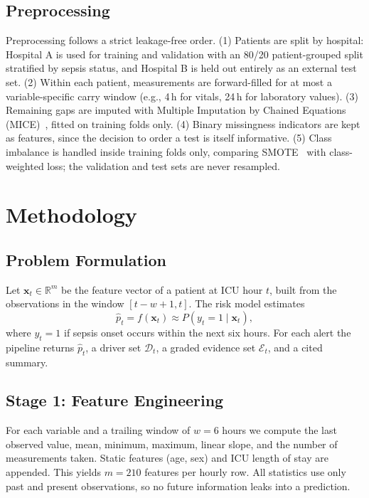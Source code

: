 \documentclass[conference]{IEEEtran}
\begin{document}
\subsection{Preprocessing}
Preprocessing follows a strict leakage-free order. (1) Patients are split
by hospital: Hospital A is used for training and validation with an 80/20
patient-grouped split stratified by sepsis status, and Hospital B is held out entirely as an
external test set. (2) Within each patient, measurements are
forward-filled for at most a variable-specific carry window (e.g., 4\,h for
vitals, 24\,h for laboratory values). (3) Remaining gaps are imputed with
Multiple Imputation by Chained Equations (MICE)~\cite{vanbuuren2011mice},
fitted on training folds only. (4) Binary missingness indicators are kept
as features, since the decision to order a test is itself
informative. (5) Class imbalance is handled inside training folds only,
comparing SMOTE~\cite{chawla2002smote} with class-weighted loss; the
validation and test sets are never resampled.

\section{Methodology}

\subsection{Problem Formulation}
Let $\mathbf{x}_{t} \in \mathbb{R}^{m}$ be the feature vector of a patient
at ICU hour $t$, built from the observations in the window $[t-w+1, t]$.
The risk model estimates
\begin{equation}
\hat{p}_t = f(\mathbf{x}_t) \approx P\left(y_t = 1 \mid \mathbf{x}_t\right),
\end{equation}
where $y_t=1$ if sepsis onset occurs within the next six hours. For each
alert the pipeline returns $\hat{p}_t$, a driver set $\mathcal{D}_t$, a
graded evidence set $\mathcal{E}_t$, and a cited summary.

\subsection{Stage 1: Feature Engineering}
For each variable and a trailing window of $w=6$ hours we compute the last
observed value, mean, minimum, maximum, linear slope, and the number of
measurements taken. Static features (age, sex) and ICU length of stay are
appended. This yields $m=210$ features per hourly row. All statistics use
only past and present observations, so no future information leaks into a
prediction.
\end{document}
